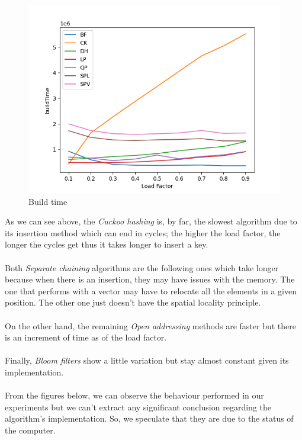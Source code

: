 \documentclass{article}
\begin{document}
        \begin{figure}[H]
        \begin{center}
          \includegraphics[width=\linewidth]{images/loadFactor_vs_buildTime.png}
          \caption{Build time}\label{fig:plot1}
        \endminipage
        \end{center}
        \end{figure}
    
    As we can see above, the \textit{Cuckoo hashing} is, by far, the slowest algorithm due to its insertion method which can end in cycles; the higher the load factor, the longer the cycles get thus it takes longer to insert a key. \\\\
    Both \textit{Separate chaining} algorithms are the following ones which take longer because when there is an insertion, they may have issues with the memory. The one that performs with a vector may have to relocate all the elements in a given position. The other one just doesn't have the spatial locality principle. \\\\
    On the other hand, the remaining \textit{Open addressing} methods are faster but there is an increment of time as of the load factor. \\\\
    Finally, \textit{Bloom filters} show a little variation but stay almost constant given its implementation. \\\\
    
    From the figures below, we can observe the behaviour performed in our experiments but we can't extract any significant conclusion regarding the algorithm's implementation. So, we speculate that they are due to the status of the computer.
    
\end{document}
